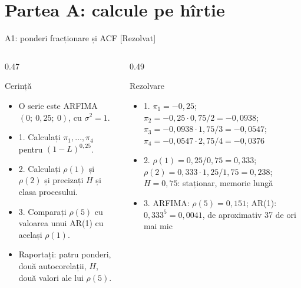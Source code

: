 \section{Partea A: calcule pe hîrtie}

\begin{frame}{A1: ponderi fracționare și ACF [Rezolvat]}
\itemsize{\scriptsize}
\begin{columns}[T]
\begin{column}{0.47\textwidth}
\begin{block}{Cerință}
\begin{itemize}
    \item O serie este ARFIMA$(0;\ 0{,}25;\ 0)$, cu $\sigma^2 = 1$.
    \item 1. Calculați $\pi_1, \dots, \pi_4$ pentru $(1-L)^{0{,}25}$.
    \item 2. Calculați $\rho(1)$ și $\rho(2)$ și precizați $H$ și clasa procesului.
    \item 3. Comparați $\rho(5)$ cu valoarea unui AR(1) cu același $\rho(1)$.
    \item Raportați: patru ponderi, două autocorelații, $H$, două valori ale lui $\rho(5)$.
\end{itemize}
\end{block}
\end{column}
\begin{column}{0.49\textwidth}
\begin{exampleblock}{Rezolvare}
\begin{itemize}
    \item 1. $\pi_1 = -0{,}25$; $\pi_2 = -0{,}25 \cdot 0{,}75/2 = -0{,}0938$; $\pi_3 = -0{,}0938 \cdot 1{,}75/3 = -0{,}0547$; $\pi_4 = -0{,}0547 \cdot 2{,}75/4 = -0{,}0376$
    \item 2. $\rho(1) = 0{,}25/0{,}75 = 0{,}333$; $\rho(2) = 0{,}333 \cdot 1{,}25/1{,}75 = 0{,}238$; $H = 0{,}75$: staționar, memorie lungă
    \item 3. ARFIMA: $\rho(5) = 0{,}151$; AR(1): $0{,}333^5 = 0{,}0041$, de aproximativ 37 de ori mai mic
\end{itemize}
\end{exampleblock}
\end{column}
\end{columns}
\end{frame}

